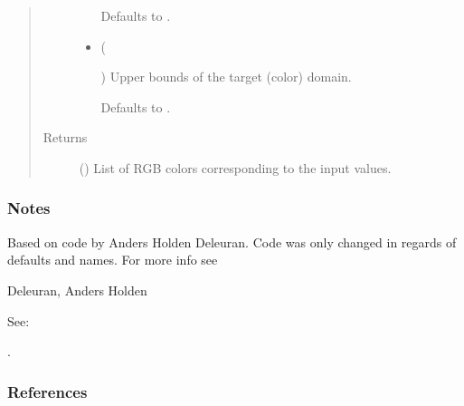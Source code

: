 \documentclass[letterpaper,10pt,english]{sphinxmanual}
\begin{document}
\begin{fulllineitems}
\begin{quote}
\begin{description}
\begin{itemize}
Defaults to .


\item {} 
 (%
\begin{footnote}[58]\sphinxAtStartFootnote
{}
%
\end{footnote}\sphinxstyleliteralemphasis{\sphinxupquote{, }}) \textendash{} 
Upper bounds of the target (color) domain.

Defaults to  .


\end{itemize}

\item[{Returns}] \leavevmode
{} () \textendash{} List of RGB colors corresponding to the input values.

\end{description}\end{quote}
\subsubsection*{Notes}

Based on code by Anders Holden Deleuran. Code was only changed in regards
of defaults and names.
For more info see  %
\begin{footnote}[10]\sphinxAtStartFootnote
Deleuran, Anders Holden 

See: \sphinxfootnotemark[59]
%
\end{footnote}%
\begin{footnotetext}[59]\sphinxAtStartFootnote
{}
%
\end{footnotetext}\ignorespaces  .
\subsubsection*{References}

\end{fulllineitems}
\end{document}
